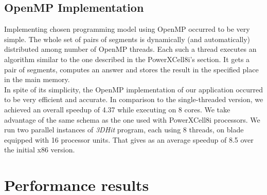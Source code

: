 \documentclass[envcountsame,envcountchap]{svmono}
\newcommand{\prog}{\emph{3DHit}}
\begin{document}
\subsection{OpenMP Implementation}
Implementing chosen programming model using OpenMP occurred to be very
simple.
The whole set of pairs of segments is dynamically (and automatically)
distributed among number of OpenMP threads.
Each such a thread executes an algorithm similar to the one described in the 
PowerXCell8i's section.
It gets a pair of segments, computes an answer and stores the result in the
specified place in the main memory.\\
In spite of its simplicity, the OpenMP implementation of our application
occurred to be very efficient and accurate.
In comparison to the single-threaded version, we achieved an overall speedup of
4.37 while executing on 8 cores.
We take advantage of the same schema as the one used with PowerXCell8i
processors. We run two parallel instances of \prog{} program, each using 8
threads, on blade equipped with 16 processor units.
That gives as an average speedup of 8.5 over the initial x86 version.

\section{Performance results}
\end{document}
